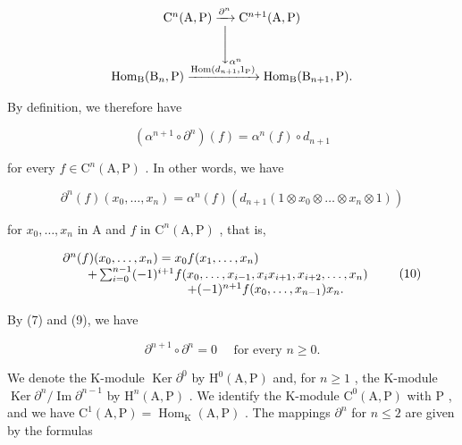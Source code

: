 \[
\begin{array}{c} \mathrm{C} ^ {n} (\mathrm{A}, \mathrm{P}) \xrightarrow {\partial^ {n}} \mathrm{C} ^ {n + 1} (\mathrm{A}, \mathrm{P}) \\ \Biggl \downarrow_ {\alpha^ {n}} \\ \mathrm{Hom} _ {\mathrm{B}} (\mathrm{B} _ {n}, \mathrm{P}) \xrightarrow {\mathrm{Hom} (d _ {n + 1} , 1 _ {\mathrm{P}})} \mathrm{Hom} _ {\mathrm{B}} (\mathrm{B} _ {n + 1}, \mathrm{P}). \end{array}
\]

By definition, we therefore have

\[
(\alpha^ {n + 1} \circ \partial^ {n}) (f) = \alpha^ {n} (f) \circ d _ {n + 1}\tag{9}
\]

for every \(f \in \mathrm{C}^n(\mathrm{A},\mathrm{P})\) . In other words, we have

\[
\partial^ {n} (f) \left(x _ {0}, \dots , x _ {n}\right) = \alpha^ {n} (f) \left(d _ {n + 1} \left(1 \otimes x _ {0} \otimes \dots \otimes x _ {n} \otimes 1\right)\right)
\]

for \(x_0, \ldots, x_n\) in A and \(f\) in \(\mathrm{C}^n(\mathrm{A}, \mathrm{P})\) , that is,

\[
\begin{array}{r l} & {\partial^ {n} (f) (x _ {0}, \ldots , x _ {n}) = x _ {0} f (x _ {1}, \ldots , x _ {n})} \\ & {\qquad + \sum_ {i = 0} ^ {n - 1} (- 1) ^ {i + 1} f (x _ {0}, \ldots , x _ {i - 1}, x _ {i} x _ {i + 1}, x _ {i + 2}, \ldots , x _ {n})} \\ & {\qquad \qquad \qquad \qquad \qquad + (- 1) ^ {n + 1} f (x _ {0}, \ldots , x _ {n - 1}) x _ {n}.} \end{array}\tag{10}
\]

By (7) and (9), we have

\[
\partial^ {n + 1} \circ \partial^ {n} = 0 \quad \text {   for   every   } n \geqslant 0.\tag{11}
\]

We denote the K-module \(\operatorname{Ker} \partial^0\) by \(\mathrm{H}^0(\mathrm{A},\mathrm{P})\) and, for \(n \geqslant 1\) , the K-module \(\operatorname{Ker} \partial^n/\operatorname{Im} \partial^{n-1}\) by \(\mathrm{H}^n(\mathrm{A},\mathrm{P})\) . We identify the K-module \(\mathrm{C}^0(\mathrm{A},\mathrm{P})\) with \(\mathrm{P}\) , and we have \(\mathrm{C}^1(\mathrm{A},\mathrm{P}) = \operatorname{Hom}_\mathrm{K}(\mathrm{A},\mathrm{P})\) . The mappings \(\partial^n\) for \(n \leqslant 2\) are given by the formulas

